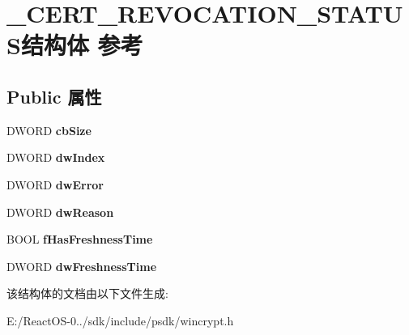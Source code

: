 \hypertarget{struct___c_e_r_t___r_e_v_o_c_a_t_i_o_n___s_t_a_t_u_s}{}\section{\+\_\+\+C\+E\+R\+T\+\_\+\+R\+E\+V\+O\+C\+A\+T\+I\+O\+N\+\_\+\+S\+T\+A\+T\+U\+S结构体 参考}
\label{struct___c_e_r_t___r_e_v_o_c_a_t_i_o_n___s_t_a_t_u_s}
\subsection*{Public 属性}
\begin{DoxyCompactItemize}
\item 
\mbox{\label{struct___c_e_r_t___r_e_v_o_c_a_t_i_o_n___s_t_a_t_u_s_a0dc518c9161d46d840e747579d3e1326}} 
D\+W\+O\+RD {\bfseries cb\+Size}
\item 
\mbox{\label{struct___c_e_r_t___r_e_v_o_c_a_t_i_o_n___s_t_a_t_u_s_adb07651bbe49d14826a2ef738650e693}} 
D\+W\+O\+RD {\bfseries dw\+Index}
\item 
\mbox{\label{struct___c_e_r_t___r_e_v_o_c_a_t_i_o_n___s_t_a_t_u_s_a84a59cf4ebad297bde70413fc0bd33c0}} 
D\+W\+O\+RD {\bfseries dw\+Error}
\item 
\mbox{\label{struct___c_e_r_t___r_e_v_o_c_a_t_i_o_n___s_t_a_t_u_s_a36bafa960777632865a07ab2592a7653}} 
D\+W\+O\+RD {\bfseries dw\+Reason}
\item 
\mbox{\label{struct___c_e_r_t___r_e_v_o_c_a_t_i_o_n___s_t_a_t_u_s_a476dc4c2ab30a8a9e316a8b29c3a7ede}} 
B\+O\+OL {\bfseries f\+Has\+Freshness\+Time}
\item 
\mbox{\label{struct___c_e_r_t___r_e_v_o_c_a_t_i_o_n___s_t_a_t_u_s_a988367d13b92394df29d59903e1a47dd}} 
D\+W\+O\+RD {\bfseries dw\+Freshness\+Time}
\end{DoxyCompactItemize}


该结构体的文档由以下文件生成\+:\begin{DoxyCompactItemize}
\item 
E\+:/\+React\+O\+S-\/0../sdk/include/psdk/wincrypt.\+h\end{DoxyCompactItemize}
